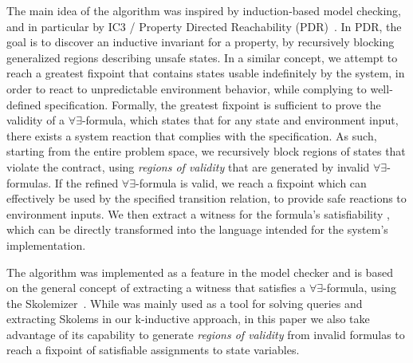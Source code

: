 The main idea of the algorithm was inspired by induction-based model checking, and in particular by IC3 / Property Directed Reachability (PDR)~\cite{bradley2011sat,een2011efficient}. In PDR, the goal is to discover an inductive invariant for a property, by recursively blocking generalized regions describing unsafe states. In a similar concept, we attempt
to reach a greatest fixpoint that contains states usable indefinitely by the
system, in order to react to unpredictable environment behavior, while
complying to well-defined specification. Formally, the greatest fixpoint is sufficient to prove the validity of a $\forall\exists$-formula, which states that for any state and environment input, there exists a system reaction that complies with the specification. As such, starting from the entire
problem space, we recursively block regions of states that violate the contract, using \textit{regions of validity} that are
generated by invalid $\forall\exists$-formulas. 
If the refined
$\forall\exists$-formula is valid, we reach a fixpoint which can effectively be used by the specified transition relation, to
provide safe reactions to environment inputs. We then extract a witness for the
formula's satisfiability%
, which can be directly transformed into the
language intended for the system's implementation.

The algorithm was implemented as a feature in the \jkind model checker and is based on the general
concept of extracting a witness that satisfies a $\forall\exists$-formula, using
the \aeval Skolemizer~\cite{fedyukovich2015automated,KatisFGBGW16}. While \aeval was mainly used as a tool for solving queries and extracting Skolems in our k-inductive approach, in this paper we also take advantage of its capability to generate
\textit{regions of validity} from invalid formulas to reach a fixpoint of satisfiable assignments to state variables.

